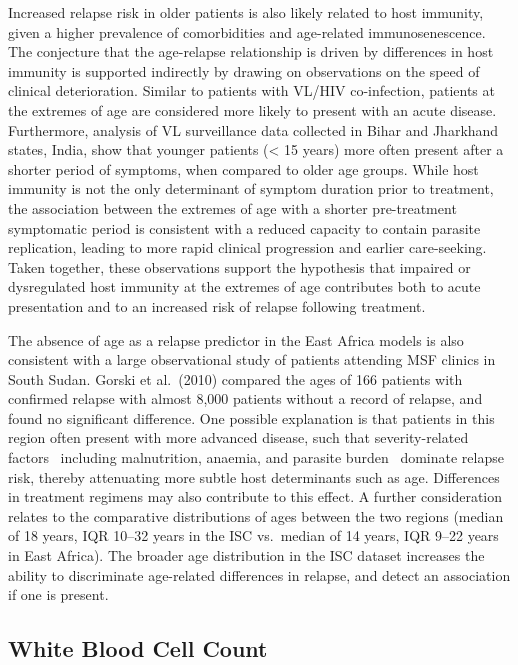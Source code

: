 Increased relapse risk in older patients is also likely related to host immunity, given a higher prevalence of comorbidities and age-related immunosenescence\cite{liu2023}. The conjecture that the age-relapse relationship is driven by differences in host immunity is supported indirectly by drawing on observations on the speed of clinical deterioration. Similar to patients with VL/HIV co-infection, patients at the extremes of age are considered more likely to present with an acute disease\cite{pareyn2025,farrar2023manson}. Furthermore, analysis of VL surveillance data collected in Bihar and Jharkhand states, India, show that younger patients (< 15 years) more often present after a shorter period of symptoms, when compared to older age groups\cite{dubey2021}. While host immunity is not the only determinant of symptom duration prior to treatment, the association between the extremes of age with a shorter pre-treatment symptomatic period is consistent with a reduced capacity to contain parasite replication, leading to more rapid clinical progression and earlier care-seeking. Taken together, these observations support the hypothesis that impaired or dysregulated host immunity at the extremes of age contributes both to acute presentation and to an increased risk of relapse following treatment.

The absence of age as a relapse predictor in the East Africa models is also consistent with a large observational study of patients attending MSF clinics in South Sudan. Gorski et al.\ (2010) compared the ages of 166 patients with confirmed relapse with almost 8,000 patients without a record of relapse, and found no significant difference\cite{gorski2010}. One possible explanation is that patients in this region often present with more advanced disease, such that severity-related factors \textemdash\ including malnutrition, anaemia, and parasite burden \textemdash\ dominate relapse risk, thereby attenuating more subtle host determinants such as age. Differences in treatment regimens may also contribute to this effect. A further consideration relates to the comparative distributions of ages between the two regions (median of 18 years, IQR 10--32 years in the ISC vs.\ median of 14 years, IQR 9--22 years in East Africa). The broader age distribution in the ISC dataset increases the ability to discriminate age-related differences in relapse, and detect an association if one is present.

\subsection{White Blood Cell Count}

